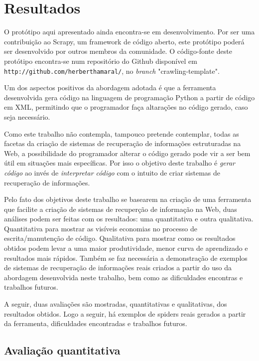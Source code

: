 \chapter{Resultados}

O protótipo aqui apresentado ainda encontra-se em desenvolvimento. Por ser uma contribuição ao Scrapy, um framework de código aberto, este protótipo poderá ser desenvolvido por outros membros da comunidade. O código-fonte deste protótipo encontra-se num repositório do Github disponível em \texttt{http://github.com/herberthamaral/}, no \emph{branch} "crawling-template".

Um dos aspectos positivos da abordagem adotada é que a ferramenta desenvolvida gera código na linguagem de programação Python a partir de código em XML, permitindo que o programador faça altarações no código gerado, caso seja necessário. 

Como este trabalho não contempla, tampouco pretende contemplar, todas as facetas da criação de sistemas de recuperação de informações estruturadas na Web, a possibilidade do programador alterar o código gerado pode vir a ser bem útil em situações mais específicas. Por isso o objetivo deste trabalho é \emph{gerar código} ao invés de \emph{interpretar código} com o intuito de criar sistemas de recuperação de informações.

Pelo fato dos objetivos deste trabalho se basearem na criação de uma ferramenta que facilite a criação de sistemas de recuperção de informação na Web, duas análises podem ser feitas com os resultados: uma quantitativa e outra qualitativa. Quantitativa para mostrar as visíveis economias no processo de escrita/manutenção de código. Qualitativa para mostrar como os resultados obtidos podem levar a uma maior produtividade, menor curva de aprendizado e resultados mais rápidos. Também se faz necessária a demonstração de exemplos de sistemas de recuperação de informações reais criados a partir do uso da abordagem desenvolvida neste trabalho, bem como as dificuldades encontras e trabalhos futuros.

A seguir, duas avaliações são mostradas, quantitativas e qualitativas, dos resultados obtidos. Logo a seguir, há exemplos de spiders reais gerados a partir da ferramenta, dificuldades encontradas e trabalhos futuros.

\section{Avaliação quantitativa}

